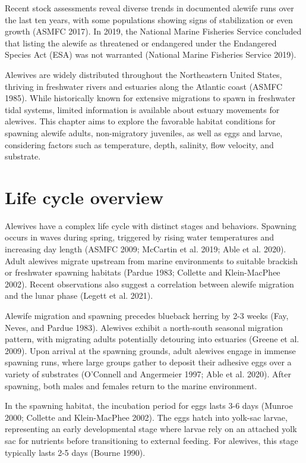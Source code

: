 \documentclass[
]{book}
\begin{document}
Recent stock assessments reveal diverse trends in documented alewife runs over the last ten years, with some populations showing signs of stabilization or even growth (ASMFC 2017). In 2019, the National Marine Fisheries Service concluded that listing the alewife as threatened or endangered under the Endangered Species Act (ESA) was not warranted (National Marine Fisheries Service 2019).

Alewives are widely distributed throughout the Northeastern United States, thriving in freshwater rivers and estuaries along the Atlantic coast (ASMFC 1985). While historically known for extensive migrations to spawn in freshwater tidal systems, limited information is available about estuary movements for alewives. This chapter aims to explore the favorable habitat conditions for spawning alewife adults, non-migratory juveniles, as well as eggs and larvae, considering factors such as temperature, depth, salinity, flow velocity, and substrate.

\hypertarget{life-cycle-overview}{%
\section{Life cycle overview}\label{life-cycle-overview}}

Alewives have a complex life cycle with distinct stages and behaviors. Spawning occurs in waves during spring, triggered by rising water temperatures and increasing day length (ASMFC 2009; McCartin et al. 2019; Able et al. 2020). Adult alewives migrate upstream from marine environments to suitable brackish or freshwater spawning habitats (Pardue 1983; Collette and Klein-MacPhee 2002). Recent observations also suggest a correlation between alewife migration and the lunar phase (Legett et al. 2021).

Alewife migration and spawning precedes blueback herring by 2-3 weeks (Fay, Neves, and Pardue 1983). Alewives exhibit a north-south seasonal migration pattern, with migrating adults potentially detouring into estuaries (Greene et al. 2009). Upon arrival at the spawning grounds, adult alewives engage in immense spawning runs, where large groups gather to deposit their adhesive eggs over a variety of substrates (O'Connell and Angermeier 1997; Able et al. 2020). After spawning, both males and females return to the marine environment.

In the spawning habitat, the incubation period for eggs lasts 3-6 days (Munroe 2000; Collette and Klein-MacPhee 2002). The eggs hatch into yolk-sac larvae, representing an early developmental stage where larvae rely on an attached yolk sac for nutrients before transitioning to external feeding. For alewives, this stage typically lasts 2-5 days (Bourne 1990).
\end{document}
